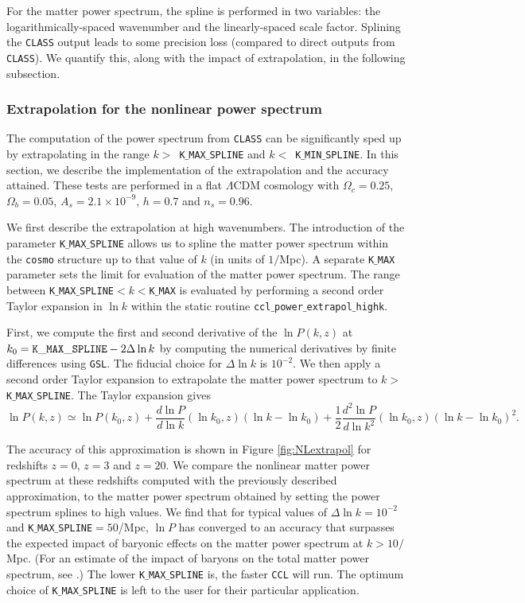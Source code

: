 \documentclass[\docopts]{\docclass}
\newcommand{\ccl}{{\tt CCL}\xspace}
\begin{document}
For the matter power spectrum, the spline is performed in two variables: the logarithmically-spaced wavenumber and the linearly-spaced scale factor. Splining the {\tt CLASS} output leads to some precision loss (compared to direct outputs from {\tt CLASS}). We quantify this, along with the impact of extrapolation, in the following subsection.

\subsubsection{Extrapolation for the nonlinear power spectrum}
\label{sec:NLextrapol}

The computation of the power spectrum from {\tt CLASS} can be significantly sped up by extrapolating in the range $k>$~{\tt K$\_$MAX$\_$SPLINE} and $k<$~{\tt K$\_$MIN$\_$SPLINE}. In this section, we describe the implementation of the extrapolation and the accuracy attained. These tests are performed in a flat $\Lambda$CDM cosmology with $\Omega_c=0.25$, $\Omega_b=0.05$, $A_s=2.1\times10^{-9}$, $h=0.7$ and $n_s=0.96$.

We first describe the extrapolation at high wavenumbers. The introduction of the parameter {\tt K$\_$MAX$\_$SPLINE} allows us to spline the matter power spectrum within the {\tt cosmo} structure up to that value of $k$ (in units of $1/$Mpc). A separate {\tt K$\_$MAX} parameter sets the limit for evaluation of the matter power spectrum. The range between {\tt K$\_$MAX$\_$SPLINE}$<k<${\tt K$\_$MAX} is evaluated by performing a second order Taylor expansion in $\ln k$ within the static routine {\tt ccl$\_$power$\_$extrapol$\_$highk}.

First, we compute the first and second derivative of the $\ln P(k,z)$ at $k_0={\rm \tt K\_MAX\_SPLINE}-2\Delta\ln k$ by computing the numerical derivatives by finite differences using {\tt GSL}. The fiducial choice for $\Delta\ln k$ is $10^{-2}$. We then apply a second order Taylor expansion to extrapolate the matter power spectrum to $k>${\tt K$\_$MAX$\_$SPLINE}. The Taylor expansion gives
%
\begin{equation}
  \ln P(k,z) \simeq \ln P(k_0,z) + \frac{d\ln P}{d\ln k}(\ln k_0,z) (\ln k-\ln k_0)  + \frac{1}{2}  \frac{d^2\ln P}{d\ln k^2}(\ln k_0,z) (\ln k-\ln k_0)^2.
  \label{eq:NLPSTaylor}
\end{equation}

The accuracy of this approximation is shown in Figure \ref{fig:NLextrapol} for redshifts $z=0$, $z=3$ and $z=20$. We compare the nonlinear matter power spectrum at these redshifts computed with the previously described approximation, to the matter power spectrum obtained by setting the power spectrum splines to high values. We find that for typical values of $\Delta \ln k=10^{-2}$ and {\tt K$\_$MAX$\_$SPLINE}$=50$/Mpc, $\ln P$ has converged to an accuracy that surpasses the expected impact of baryonic effects on the matter power spectrum at $k>10/$Mpc.  (For an estimate of the impact of baryons on the total matter power spectrum, see \citealt{Schneider15}.) The lower {\tt K$\_$MAX$\_$SPLINE} is, the faster \ccl will run. The optimum choice of {\tt K$\_$MAX$\_$SPLINE} is left to the user for their particular application.
\end{document}
